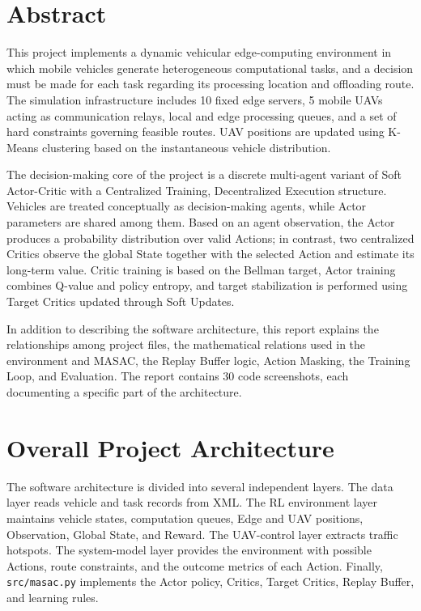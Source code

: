 \documentclass[a4paper,12pt]{article}
\newcommand{\code}[1]{\texttt{#1}}
\begin{document}
\pagestyle{fancy}
\fancyhf{}
\fancyfoot[C]{\thepage}
\renewcommand{\headrulewidth}{0.3pt}
\setlength{\headheight}{15pt}
\setcounter{page}{1}

\tableofcontents
\clearpage

\section*{Abstract}
This project implements a dynamic vehicular edge-computing environment in which mobile vehicles generate heterogeneous computational tasks, and a decision must be made for each task regarding its processing location and offloading route. The simulation infrastructure includes 10 fixed edge servers, 5 mobile UAVs acting as communication relays, local and edge processing queues, and a set of hard constraints governing feasible routes. UAV positions are updated using K-Means clustering based on the instantaneous vehicle distribution.

The decision-making core of the project is a discrete multi-agent variant of Soft Actor-Critic with a Centralized Training, Decentralized Execution structure. Vehicles are treated conceptually as decision-making agents, while Actor parameters are shared among them. Based on an agent observation, the Actor produces a probability distribution over valid Actions; in contrast, two centralized Critics observe the global State together with the selected Action and estimate its long-term value. Critic training is based on the Bellman target, Actor training combines Q-value and policy entropy, and target stabilization is performed using Target Critics updated through Soft Updates.

In addition to describing the software architecture, this report explains the relationships among project files, the mathematical relations used in the environment and MASAC, the Replay Buffer logic, Action Masking, the Training Loop, and Evaluation. The report contains 30 code screenshots, each documenting a specific part of the architecture.

\section{Overall Project Architecture}
The software architecture is divided into several independent layers. The data layer reads vehicle and task records from XML. The RL environment layer maintains vehicle states, computation queues, Edge and UAV positions, Observation, Global State, and Reward. The UAV-control layer extracts traffic hotspots. The system-model layer provides the environment with possible Actions, route constraints, and the outcome metrics of each Action. Finally, \code{src/masac.py} implements the Actor policy, Critics, Target Critics, Replay Buffer, and learning rules.
\end{document}
